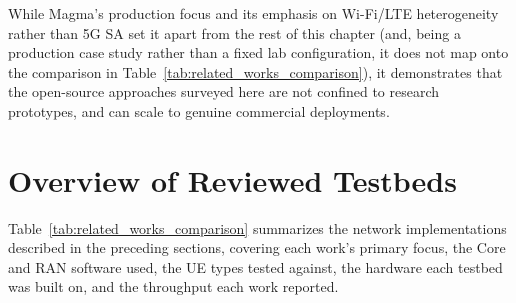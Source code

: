 While Magma's production focus and its emphasis on Wi-Fi/\gls{LTE} heterogeneity rather than 5G \gls{SA} set it apart from the rest of this chapter (and, being a production case study rather than a fixed lab configuration, it does not map onto the comparison in Table~\ref{tab:related_works_comparison}), it demonstrates that the open-source approaches surveyed here are not confined to research prototypes, and can scale to genuine commercial deployments.

\section{Overview of Reviewed Testbeds}
\label{sec:related_overview}

Table~\ref{tab:related_works_comparison} summarizes the network implementations described in the preceding sections, covering each work's primary focus, the Core and \gls{RAN} software used, the \gls{UE} types tested against, the hardware each testbed was built on, and the throughput each work reported.

